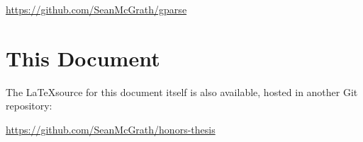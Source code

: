 \bigskip
\noindent\href{https://github.com/SeanMcGrath/gparse}{https://github.com/SeanMcGrath/gparse}

\section{This Document}

The \LaTeX source for this document itself is also available, hosted in another Git repository:

\bigskip
\noindent\href{https://github.com/SeanMcGrath/honors-thesis}{https://github.com/SeanMcGrath/honors-thesis}